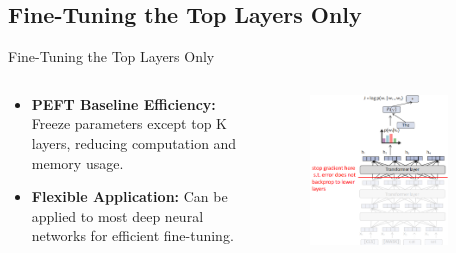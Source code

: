 \documentclass[serif, aspectratio=169]{beamer}
\begin{document}
\subsection{Fine-Tuning the Top Layers Only}
\begin{frame}{Fine-Tuning the Top Layers Only}
    \begin{columns} %

        \begin{column}{0.5\textwidth}
            \begin{itemize}
                \item  
                    \textbf{PEFT Baseline Efficiency:}
                     Freeze parameters except top K layers, reducing computation and memory usage.
                    \vspace{0.3cm}
                \item  
                    \textbf{Flexible Application:}
                      Can be applied to most deep neural networks for efficient fine-tuning.
                    \vspace{0.3cm}
            \end{itemize}
        \end{column}

        \begin{column}{0.5\textwidth}
            \begin{figure}
                \centering
                \includegraphics[width=0.85\textwidth, height=0.85\textheight]{pic/last layer.PNG}
            \end{figure}
        \end{column}

    \end{columns}
\end{frame}
\end{document}
